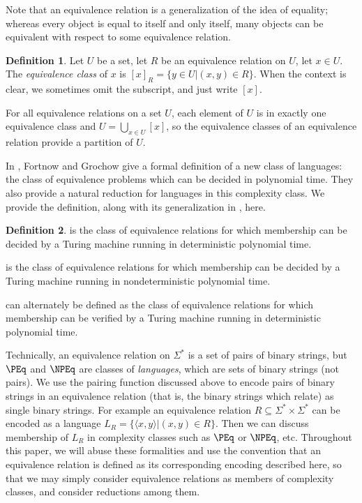 \documentclass{article}
\theoremstyle{definition} \newtheorem{definition}[definition]{Definition}
\newcommand{\sigmastar}{\Sigma^{*}} %
\newcommand{\defn}[1]{\emph{#1}} %
\newcommand{\pair}[2]{\langle#1,#2\rangle} %
\begin{document}
Note that an equivalence relation is a generalization of the idea of equality;
whereas every object is equal to itself and only itself, many objects can be
equivalent with respect to some equivalence relation.

\begin{definition}
  Let $U$ be a set, let $R$ be an equivalence relation on $U$, let $x\in
  U$. The \defn{equivalence class} of $x$ is $[x]_R=\{y\in U|(x,y)\in
  R\}$. When the context is clear, we sometimes omit the subscript, and just
  write $[x]$.
\end{definition}
For all equivalence relations on a set $U$, each element of $U$ is in exactly
one equivalence class and $U=\bigcup_{x\in U}{[x]}$, so the equivalence classes
of an equivalence relation provide a partition of $U$.

In \cite{fg09}, Fortnow and Grochow give a formal definition of a new class of
languages: the class of equivalence problems which can be decided in polynomial
time. They also provide a natural reduction for languages in this complexity
class. We provide the definition, along with its generalization in \NP, here.

\begin{definition}\label{def:peq}
  \defn{\PEq} is the class of equivalence relations for which membership can be
  decided by a Turing machine running in deterministic polynomial time.

  \defn{\NPEq} is the class of equivalence relations for which membership can
  be decided by a Turing machine running in nondeterministic polynomial time.

  \defn{\NPEq} can alternately be defined as the class of equivalence relations
  for which membership can be verified by a Turing machine running in
  deterministic polynomial time.
\end{definition}

Technically, an equivalence relation on $\sigmastar$ is a set of pairs of
binary strings, but $\PEq$ and $\NPEq$ are classes of \emph{languages}, which
are sets of binary strings (not pairs). We use the pairing function discussed
above to encode pairs of binary strings in an equivalence relation (that is,
the binary strings which relate) as single binary strings. For example an
equivalence relation $R\subseteq\sigmastar\times\sigmastar$ can be encoded as a
language $L_R=\{\pair{x}{y}|(x,y)\in R\}$. Then we can discuss membership of
$L_R$ in complexity classes such as $\PEq$ or $\NPEq$, etc. Throughout this
paper, we will abuse these formalities and use the convention that an
equivalence relation is defined as its corresponding encoding described here,
so that we may simply consider equivalence relations as members of complexity
classes, and consider reductions among them.
\end{document}
